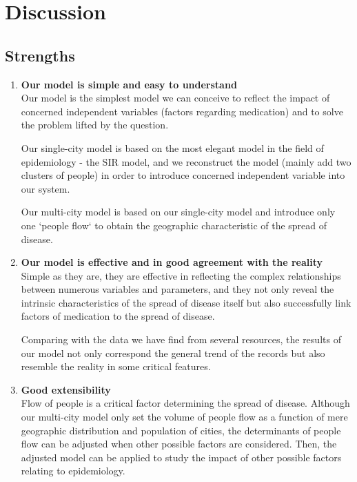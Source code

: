 \section{Discussion}
\subsection{Strengths}
\begin{enumerate}
	\item \textbf{Our model is simple and easy to understand} \\
	      Our model is the simplest model we can conceive to reflect the impact of concerned independent variables (factors regarding medication) and to solve the problem lifted by the question.

	      Our single-city model is based on the most elegant model in the field of epidemiology - the SIR model, and we reconstruct the model (mainly add two clusters of people) in order to introduce concerned independent variable into our system.

	      Our multi-city model is based on our single-city model and introduce only one `people flow` to obtain the geographic characteristic of the spread of disease.

	\item \textbf{Our model is effective and in good agreement with the reality} \\
	      Simple as they are, they are effective in reflecting the complex relationships between numerous variables and parameters, and they not only reveal the intrinsic characteristics of the spread of disease itself but also successfully link factors of medication to the spread of disease.

	      Comparing with the data we have find from several resources, the results of our model not only correspond the general trend of the records but also resemble the reality in some critical features.

	\item \textbf{Good extensibility} \\
	      Flow of people is a critical factor determining the spread of disease. Although our multi-city model only set the volume of people flow as a function of mere geographic distribution and population of cities, the determinants of people flow can be adjusted when other possible factors are considered. Then, the adjusted model can be applied to study the impact of other possible factors relating to epidemiology.

\end{enumerate}



